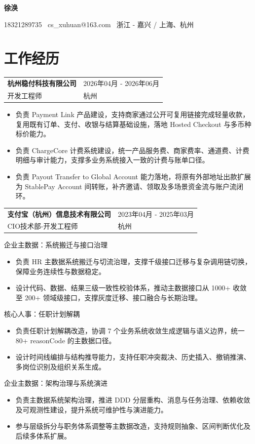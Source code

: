 \documentclass[10pt]{article}
\makeatletter
\newcommand{\resumeEntry}[4]{
  \begin{tabularx}{\textwidth}{@{}X>{\raggedleft\arraybackslash}p{5.2cm}@{}}
    {\fontsize{11.5}{13.5}\selectfont\bfseries\color{heading} #1} & {\small\color{subtle} #3} \\
    {\small\color{textgray} #2} & {\small\color{textgray} #4} \\
  \end{tabularx}
  \vspace{2pt}
}
\newcommand{\projectTitle}[1]{
  {\normalsize\color{heading} #1}\par
  \vspace{2pt}
}
\newcommand{\projectGap}{
  \vspace{5pt}
}
\makeatother
\begin{document}
{\LARGE\bfseries 徐涣}\par
\vspace{2pt}
{\small 18321289735 \textbar\ cs\_xuhuan@163.com \textbar\ 浙江 - 嘉兴 / 上海、杭州}\par

\section{工作经历}

\resumeEntry
  {杭州稳付科技有限公司}
  {开发工程师}
  {2026年04月 - 2026年06月}
  {杭州}

\begin{itemize}
  \item 负责 Payment Link 产品建设，支持商家通过公开可复用链接完成轻量收款，复用既有订单、支付、收银与结算基础设施，落地 Hosted Checkout 与多币种标价能力。
  \item 负责 ChargeCore 计费系统建设，统一产品服务费、商家费率、通道费、计费明细与审计能力，支撑多业务系统接入一致的计费与账单口径。
  \item 负责 Payout Transfer to Global Account 能力落地，将原有外部地址出款扩展为 StablePay Account 间转账，补齐邀请、领取及多场景资金流与账户流闭环。
\end{itemize}
\projectGap

\resumeEntry
  {支付宝（杭州）信息技术有限公司}
  {CIO技术部-开发工程师}
  {2023年04月 - 2025年03月}
  {杭州}

\projectTitle{企业主数据：系统搬迁与接口治理}
\begin{itemize}
  \item 负责 HR 主数据系统搬迁与切流治理，支撑千级接口迁移与复杂调用链切换，保障业务连续性与数据稳定。
  \item 设计代码、数据、结果三级一致性校验体系，推动主数据接口从 1000+ 收敛至 200+ 领域级接口，支撑灰度迁移、接口融合与长期治理。
\end{itemize}
\projectGap

\projectTitle{核心人事：任职计划解耦}
\begin{itemize}
  \item 负责任职计划解耦改造，协调 7 个业务系统收敛生成逻辑与语义边界，统一 80+ reasonCode 的主数据口径。
  \item 设计时间线编排与结构推导能力，支持任职冲突裁决、历史插入、撤销推演、多岗位识别及组织关系生成。
\end{itemize}
\projectGap

\projectTitle{企业主数据：架构治理与系统演进}
\begin{itemize}
  \item 负责主数据系统架构治理，推进 DDD 分层重构、消息与任务治理、依赖收敛及可观测性建设，提升系统可维护性与演进能力。
  \item 参与层级拆分与职务体系调整等主数据改造，支持规则抽象、区间判断优化及后续多体系扩展。
\end{itemize}
\projectGap
\end{document}
